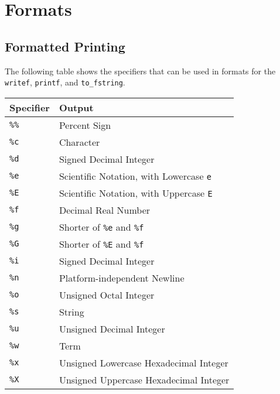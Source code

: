 
\chapter{\label{chapter:format}Formats}

\section{Formatted Printing}
The following table shows the specifiers that can be used in formats for the \texttt{writef}, \texttt{printf}, and \texttt{to\_fstring}.

\begin{table}[h]
\begin{tabular}{|l|l|}
\hline
\textbf{Specifier} & \textbf{Output} \\
\hline 
\hline 
\texttt{\%\%} & Percent Sign \\
\texttt{\%c} & Character \\
\texttt{\%d} & Signed Decimal Integer \\
\texttt{\%e} & Scientific Notation, with Lowercase \texttt{e} \\
\texttt{\%E} & Scientific Notation, with Uppercase \texttt{E} \\
\texttt{\%f}& Decimal Real Number \\
\texttt{\%g} & Shorter of \texttt{\%e} and \texttt{\%f} \\
\texttt{\%G} & Shorter of \texttt{\%E} and \texttt{\%f} \\
\texttt{\%i} & Signed Decimal Integer \\
\texttt{\%n} & Platform-independent Newline \\
\texttt{\%o} &  Unsigned Octal Integer \\
\texttt{\%s} & String \\
\texttt{\%u} & Unsigned Decimal Integer \\
\texttt{\%w} & Term \\
\texttt{\%x} & Unsigned Lowercase Hexadecimal Integer \\
\texttt{\%X} & Unsigned Uppercase Hexadecimal Integer \\
\hline
\end{tabular}
\end{table}

